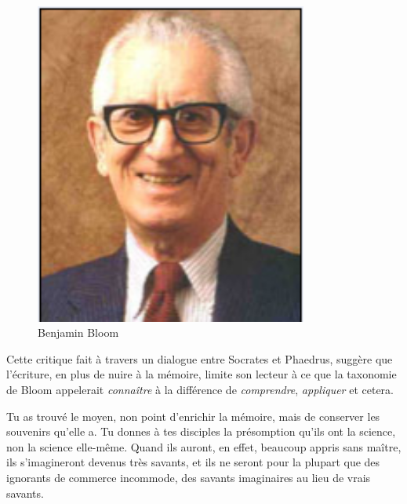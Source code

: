 \begin{minipage}[H]{0.3\linewidth}
  \begin{figure}[H]
  \centering
  \includegraphics[width=0.8\textwidth]{../resources/illustrations/bloom_face}
  \caption{Benjamin Bloom}
  \end{figure}
\end{minipage}
\begin{minipage}[H]{0.69\linewidth}
Cette critique fait à travers un dialogue entre Socrates et Phaedrus, suggère que l'écriture, en plus de nuire à la mémoire, limite son lecteur à ce que la taxonomie de Bloom\cite{tax-bloom} appelerait \emph{connaître} à la différence de \emph{comprendre}, \emph{appliquer} et cetera. 
\vspace{1cm}
\end{minipage}

\begin{coolquote}
Tu as trouvé le moyen, non point d’enrichir la mémoire, mais de conserver les souvenirs qu’elle a. Tu donnes à tes disciples la présomption qu’ils ont la science, non la science elle-même. Quand ils auront, en effet, beaucoup appris sans maître, ils s’imagineront devenus très savants, et ils ne seront pour la plupart que des ignorants de commerce incommode, des savants imaginaires au lieu de vrais savants.
\end{coolquote}

